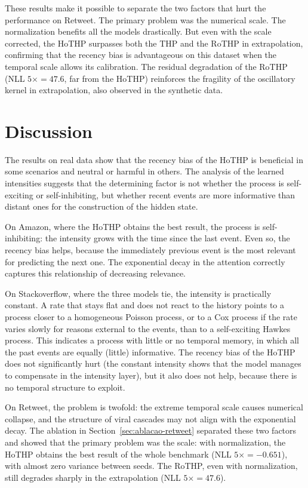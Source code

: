 These results make it possible to separate the two factors that hurt the performance on Retweet. The primary problem was the numerical scale. The normalization benefits all the models drastically. But even with the scale corrected, the HoTHP surpasses both the THP and the RoTHP in extrapolation, confirming that the recency bias is advantageous on this dataset when the temporal scale allows its calibration. The residual degradation of the RoTHP (NLL $5\times = 47.6$, far from the HoTHP) reinforces the fragility of the oscillatory kernel in extrapolation, also observed in the synthetic data.

\section{Discussion}
\label{sec:discussao-resultados}

The results on real data show that the recency bias of the HoTHP is beneficial in some scenarios and neutral or harmful in others. The analysis of the learned intensities suggests that the determining factor is not whether the process is self-exciting or self-inhibiting, but whether recent events are more informative than distant ones for the construction of the hidden state.

On Amazon, where the HoTHP obtains the best result, the process is self-inhibiting: the intensity grows with the time since the last event. Even so, the recency bias helps, because the immediately previous event is the most relevant for predicting the next one. The exponential decay in the attention correctly captures this relationship of decreasing relevance.

On Stackoverflow, where the three models tie, the intensity is practically constant. A rate that stays flat and does not react to the history points to a process closer to a homogeneous Poisson process, or to a Cox process if the rate varies slowly for reasons external to the events, than to a self-exciting Hawkes process. This indicates a process with little or no temporal memory, in which all the past events are equally (little) informative. The recency bias of the HoTHP does not significantly hurt (the constant intensity shows that the model manages to compensate in the intensity layer), but it also does not help, because there is no temporal structure to exploit.

On Retweet, the problem is twofold: the extreme temporal scale causes numerical collapse, and the structure of viral cascades may not align with the exponential decay. The ablation in Section~\ref{sec:ablacao-retweet} separated these two factors and showed that the primary problem was the scale: with normalization, the HoTHP obtains the best result of the whole benchmark (NLL $5\times = -0.651$), with almost zero variance between seeds. The RoTHP, even with normalization, still degrades sharply in the extrapolation (NLL $5\times = 47.6$).

